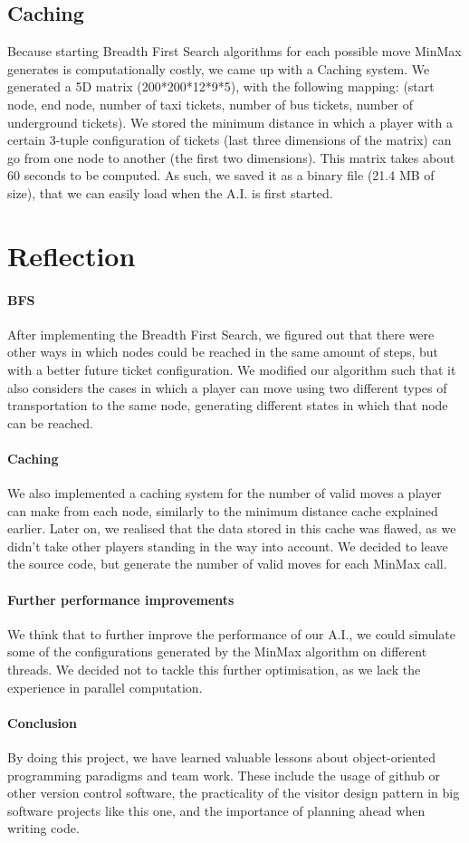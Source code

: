 \documentclass[12pt,a4paper]{scrartcl}
\begin{document}
\subsection*{Caching}
Because starting Breadth First Search algorithms for each possible move MinMax generates is computationally costly, we came up with a Caching system. We generated a 5D matrix (200*200*12*9*5), with the following mapping: (start node, end node, number of taxi tickets, number of bus tickets, number of underground tickets). 
We stored the minimum distance in which a player with a certain 3-tuple configuration of tickets (last three dimensions of the matrix) can go from one node to another (the first two dimensions).
This matrix takes about 60 seconds to be computed. As such, we saved it as a binary file (21.4 MB of size), that we can easily load when the A.I. is first started.

\section{Reflection}

\paragraph{BFS} After implementing the Breadth First Search, we figured out that there were other ways in which nodes could be reached in the same amount of steps, but with a better future ticket configuration. We modified our algorithm such that it also considers the cases in which a player can move using two different types of transportation to the same node, generating different states in which that node can be reached.

\paragraph{Caching} We also implemented a caching system for the number of valid moves a player can make from each node, similarly to the minimum distance cache explained earlier. Later on, we realised that the data stored in this cache was flawed, as we didn't take other players standing in the way into account. We decided to leave the source code, but generate the number of valid moves for each MinMax call.

\paragraph{Further performance improvements} We think that to further improve the performance of our A.I., we could simulate some of the configurations generated by the MinMax algorithm on different threads. We decided not to tackle this further optimisation, as we lack the experience in parallel computation.

\paragraph{Conclusion}
By doing this project, we have learned valuable lessons about object-oriented programming paradigms and team work. These include the usage of github or other version control software, the practicality of the visitor design pattern in big software projects like this one, and the importance of planning ahead when writing code.
\end{document}
